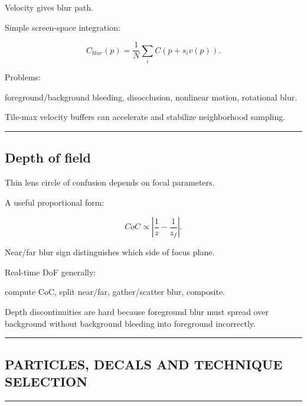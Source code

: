 Velocity gives blur path.

Simple screen-space integration:

\[
C_{blur}(p)
=
\frac1N
\sum_i
C(
p+s_iv(p)
).
\]

Problems:

foreground/background bleeding, disocclusion, nonlinear motion, rotational blur.

Tile-max velocity buffers can accelerate and stabilize neighborhood sampling.

\begin{center}\rule{0.5\linewidth}{0.5pt}\end{center}

\subsection{Depth of field}\label{04-visual-computing-ii-ch040-depth-of-field}

\hypertarget{04-visual-computing-ii-ch040-depth-of-field}{}

Thin lens circle of confusion depends on focal parameters.

A useful proportional form:

\[
CoC
\propto
\left|
\frac1z-
\frac1{z_f}
\right|.
\]

Near/far blur sign distinguishes which side of focus plane.

Real-time DoF generally:

compute CoC, split near/far, gather/scatter blur, composite.

Depth discontinuities are hard because foreground blur must spread over background without background bleeding into foreground incorrectly.

\begin{center}\rule{0.5\linewidth}{0.5pt}\end{center}

\subsection{PARTICLES, DECALS AND TECHNIQUE SELECTION}\label{04-visual-computing-ii-ch040-particles-decals-and-technique-selection}

\hypertarget{04-visual-computing-ii-ch040-particles-decals-and-technique-selection}{}

\begin{center}\rule{0.5\linewidth}{0.5pt}\end{center}

